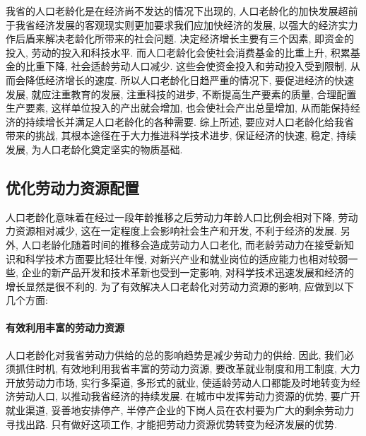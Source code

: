 \documentclass[a4paper, 12pt, UTF8]{article}
\begin{document}
我省的人口老龄化是在经济尚不发达的情况下出现的, 人口老龄化的加快发展超前于我省经济发展的客观现实则更加要求我们应加快经济的发展, 以强大的经济实力作后盾来解决老龄化所带来的社会问题. 决定经济增长主要有三个因素, 即资金的投入, 劳动的投入和科技水平. 而人口老龄化会使社会消费基金的比重上升, 积累基金的比重下降, 社会适龄劳动人口减少. 这些会使资金投入和劳动投入受到限制, 从而会降低经济增长的速度. 所以人口老龄化日趋严重的情况下, 要促进经济的快速发展, 就应注重教育的发展, 注重科技的进步, 不断提高生产要素的质量, 合理配置生产要素, 这样单位投入的产出就会增加, 也会使社会产出总量增加, 从而能保持经济的持续增长并满足人口老龄化的各种需要. 综上所述, 要应对人口老龄化给我省带来的挑战, 其根本途径在于大力推进科学技术进步, 保证经济的快速, 稳定, 持续发展, 为人口老龄化奠定坚实的物质基础. 

\subsection{优化劳动力资源配置}
人口老龄化意味着在经过一段年龄推移之后劳动力年龄人口比例会相对下降, 劳动力资源相对减少, 这在一定程度上会影响社会生产和开发, 不利于经济的发展. 另外, 人口老龄化随着时间的推移会造成劳动力人口老化, 而老龄劳动力在接受新知识和科学技术方面要比轻壮年慢, 对新兴产业和就业岗位的适应能力也相对较弱一些, 企业的新产品开发和技术革新也受到一定影响, 对科学技术迅速发展和经济的增长显然是很不利的. 为了有效解决人口老龄化对劳动力资源的影响, 应做到以下几个方面:

\paragraph{有效利用丰富的劳动力资源}
人口老龄化对我省劳动力供给的总的影响趋势是减少劳动力的供给. 因此, 我们必须抓住时机, 有效地利用我省丰富的劳动力资源, 要改革就业制度和用工制度, 大力开放劳动力市场, 实行多渠道, 多形式的就业, 使适龄劳动人口都能及时地转变为经济劳动人口, 以推动我省经济的持续发展. 在城市中发挥劳动力资源的优势, 要广开就业渠道, 妥善地安排停产, 半停产企业的下岗人员在农村要为广大的剩余劳动力寻找出路. 只有做好这项工作, 才能把劳动力资源优势转变为经济发展的优势.
\end{document}
